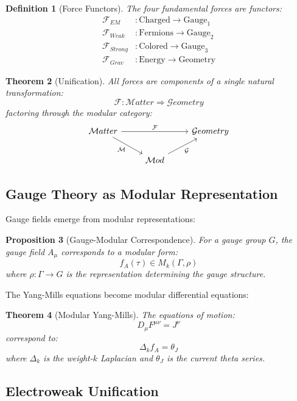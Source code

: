 \documentclass[12pt,a4paper]{article}
\newtheorem{theorem}{Theorem}[section]
\newtheorem{proposition}[theorem]{Proposition}
\newtheorem{definition}[theorem]{Definition}
\begin{document}
\begin{definition}[Force Functors]
The four fundamental forces are functors:
\begin{align}
\mathcal{F}_{EM} &: \text{Charged} \to \text{Gauge}_1 \\
\mathcal{F}_{Weak} &: \text{Fermions} \to \text{Gauge}_2 \\
\mathcal{F}_{Strong} &: \text{Colored} \to \text{Gauge}_3 \\
\mathcal{F}_{Grav} &: \text{Energy} \to \text{Geometry}
\end{align}
\end{definition}

\begin{theorem}[Unification]
All forces are components of a single natural transformation:
\[
\mathcal{F}: \mathcal{M}atter \Rightarrow \mathcal{G}eometry
\]
factoring through the modular category:
\[
\begin{tikzcd}
\mathcal{M}atter \arrow[rr, "\mathcal{F}"] \arrow[rd, "\mathcal{M}"'] & & \mathcal{G}eometry \\
& \mathcal{M}od \arrow[ru, "\mathcal{G}"'] &
\end{tikzcd}
\]
\end{theorem}

\subsection{Gauge Theory as Modular Representation}

Gauge fields emerge from modular representations:

\begin{proposition}[Gauge-Modular Correspondence]
For a gauge group $G$, the gauge field $A_\mu$ corresponds to a modular form:
\[
f_A(\tau) \in M_k(\Gamma, \rho)
\]
where $\rho: \Gamma \to G$ is the representation determining the gauge structure.
\end{proposition}

The Yang-Mills equations become modular differential equations:

\begin{theorem}[Modular Yang-Mills]
The equations of motion:
\[
D_\mu F^{\mu\nu} = J^\nu
\]
correspond to:
\[
\Delta_k f_A = \theta_J
\]
where $\Delta_k$ is the weight-$k$ Laplacian and $\theta_J$ is the current theta series.
\end{theorem}

\subsection{Electroweak Unification}
\end{document}
